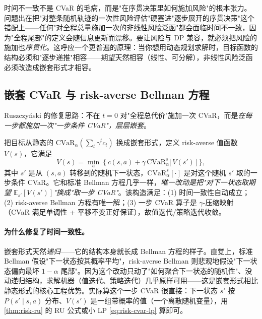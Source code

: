 \begin{insight}
时间不一致不是 CVaR 的毛病，而是"在序贯决策里如何施加风险"的根本张力。问题出在把"对整条随机轨迹的一次性风险评估"硬塞进"逐步展开的序贯决策"这个错配上——任何"对全程总量施加一次的非线性风险泛函"都会面临时间不一致，因为"全程尾部"的定义会随信息更新而漂移。要让风险与 DP 兼容，就必须把风险的施加也\emph{序贯化}。这呼应一个更普遍的原理：当你想用动态规划求解时，目标函数的结构必须和"逐步递推"相容——期望天然相容（线性、可分解），非线性风险泛函必须改造成嵌套形式才相容。
\end{insight}

\subsection{嵌套 CVaR 与 risk-averse Bellman 方程}
\label{sec:risk-bellman}

Ruszczyński\cite{ruszczynski2010risk} 的修复思路：不在 $t=0$ 对"全程总代价"施加一次 CVaR，而是\emph{在每一步都施加一次"一步条件 CVaR"，层层嵌套}。

\begin{theorem}\label{thm:risk-nested}
把目标从静态的 $\mathrm{CVaR}_\alpha(\sum_t\gamma^t c_t)$ 换成嵌套形式，定义 risk-averse 值函数 $V(s)$，它满足
\begin{equation}
  V(s)=\min_{a}\ \Big\{\,c(s,a)+\gamma\,\mathrm{CVaR}_\alpha^{s}\big[\,V(s')\,\big]\,\Big\},
  \label{eq:risk-bellman}
\end{equation}
其中 $s'$ 是从 $(s,a)$ 转移到的随机下一状态，$\mathrm{CVaR}_\alpha^{s}[\cdot]$ 是对这个随机 $s'$ 取的一步条件 CVaR。它和标准 Bellman 方程几乎一样，\emph{唯一改动是把"对下一状态取期望 $\mathbb{E}_{s'}[V(s')]$"换成"取一步 CVaR"}。该构造满足：(1) 时间一致性自动成立；(2) risk-averse Bellman 方程有唯一解；(3) 一步 CVaR 算子是 $\gamma$-压缩映射（CVaR 满足单调性 + 平移不变正好保证），故值迭代/策略迭代收敛。
\end{theorem}

\paragraph{为什么修复了时间一致性。}
嵌套形式天然\emph{递归}——它的结构本身就长成 Bellman 方程的样子。直觉上，标准 Bellman 假设"下一状态按其概率平均"，risk-averse Bellman 则悲观地假设"下一状态偏向最坏 $1-\alpha$ 尾部"。因为这个改动只动了"如何聚合下一状态的随机性"、没动递归结构，求解机器（值迭代、策略迭代）几乎原样可用——这是嵌套形式相比静态形式的核心工程优势。实际算这个一步 CVaR 很直接：下一状态 $s'$ 按 $P(s'\mid s,a)$ 分布、$V(s')$ 是一组带概率的值（一个离散随机变量），用 \cref{thm:risk-ru} 的 RU 公式或小 LP \cref{eq:risk-cvar-lp} 算即可。

